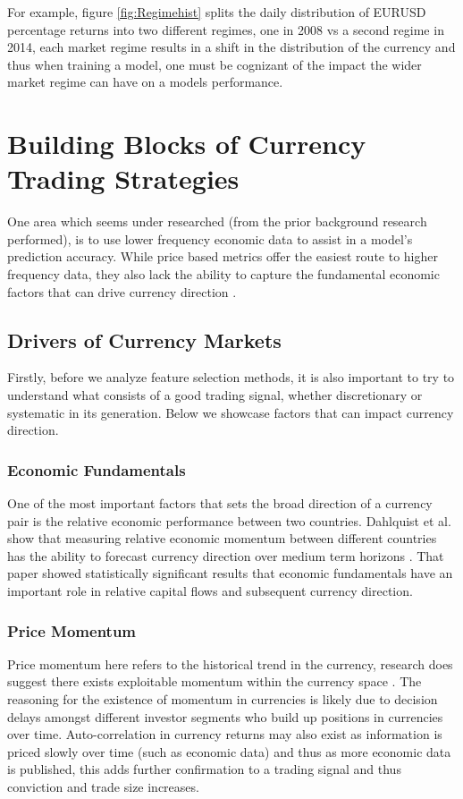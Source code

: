 \documentclass[11pt]{article}
\begin{document}
For example, figure \ref{fig:Regimehist} splits the daily distribution of EURUSD percentage returns into two different regimes, one in 2008 vs a second regime in 2014, each market regime results in a shift in the distribution of the currency and thus when training a model, one must be cognizant of the impact the wider market regime can have on a models performance.

\clearpage

\section{Building Blocks of Currency Trading Strategies}
One area which seems under researched (from the prior background research performed), is to use lower frequency economic data to assist in a model's prediction accuracy. While price based metrics offer the easiest route to higher frequency data, they also lack the ability to capture the fundamental economic factors that can drive currency direction \cite{medium}. 

\subsection{Drivers of Currency Markets}

Firstly, before we analyze feature selection methods, it is also important to try to understand what consists of a good trading signal, whether discretionary or systematic in its generation. Below we showcase factors that can impact currency direction.
\subsubsection{Economic Fundamentals}
One of the most important factors that sets the broad direction of a currency pair is the relative economic performance between two countries.
Dahlquist et al. show that measuring relative economic momentum between different countries has the ability to forecast currency direction over medium term horizons \cite{Dahlquist2015}. That paper showed statistically significant results that economic fundamentals have an important role in relative capital flows and subsequent currency direction.
\subsubsection{Price Momentum}
Price momentum here refers to the historical trend in the currency,  research does suggest there exists  exploitable momentum within the currency space \cite{Moskowitz2012}. The reasoning for the existence of momentum in currencies is likely due to decision delays amongst different investor segments who build up positions in currencies over time. Auto-correlation in currency returns may also exist as information is priced slowly over time (such as economic data) and thus as more economic data is published, this adds further confirmation to a trading signal and thus conviction and trade size increases.
\end{document}

